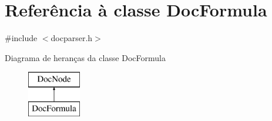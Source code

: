 \hypertarget{class_doc_formula}{\section{Referência à classe Doc\-Formula}
\label{class_doc_formula}
}


{\ttfamily \#include $<$docparser.\-h$>$}

Diagrama de heranças da classe Doc\-Formula\begin{figure}[H]
\begin{center}
\leavevmode
\includegraphics[height=2.000000cm]{class_doc_formula}
\end{center}
\end{figure}
